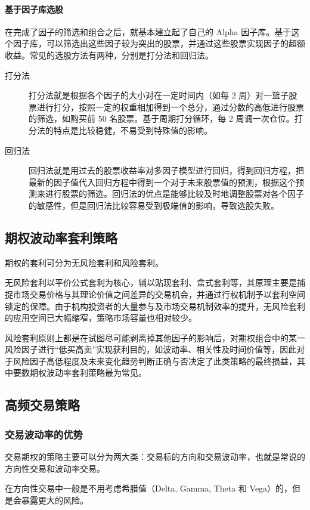 \paragraph{基于因子库选股} 在完成了因子的筛选和组合之后，就基本建立起了自己的 Alpha 因子库。基于这个因子库，可以筛选出这些因子较为突出的股票，并通过这些股票实现因子的超额收益。常见的选股方法有两种，分别是打分法和回归法。
\begin{description}
    \item[打分法] 打分法就是根据各个因子的大小对在一定时间内（如每 2 周）对一篮子股票进行打分，按照一定的权重相加得到一个总分，通过分数的高低进行股票的筛选，如购买前 50 名股票。基于周期打分循环，每 2 周调一次仓位。打分法的特点是比较稳健，不易受到特殊值的影响。
    \item[回归法] 回归法就是用过去的股票收益率对多因子模型进行回归，得到回归方程，把最新的因子值代入回归方程中得到一个对于未来股票值的预测，根据这个预测来进行股票的筛选。回归法的优点是能够比较及时地调整股票对各个因子的敏感性，但是回归法比较容易受到极端值的影响，导致选股失败。
\end{description}
\subsection{期权波动率套利策略}
期权的套利可分为无风险套利和风险套利。

无风险套利以平价公式套利为核心，辅以贴现套利、盒式套利等，其原理主要是捕捉市场交易价格与其理论价值之间差异的交易机会，并通过行权机制予以套利空间锁定的保障。由于机构投资者的大量参与及市场交易机制效率的提升，无风险套利的应用空间已大幅缩窄，策略市场容量也相对较少。

风险套利原则上都是在试图尽可能剥离掉其他因子的影响后，对期权组合中的某一风险因子进行“低买高卖”实现获利目的，如波动率、相关性及时间价值等，因此对于风险因子高低程度及未来变化趋势判断正确与否决定了此类策略的最终损益，其中要数期权波动率套利策略最为常见。
\subsection{高频交易策略}
\subsubsection*{交易波动率的优势}

交易期权的策略主要可以分为两大类：交易标的方向和交易波动率，也就是常说的方向性交易和波动率交易。

在方向性交易中一般是不用考虑希腊值（Delta, Gamma, Theta 和 Vega）的，但是会暴露更大的风险。

